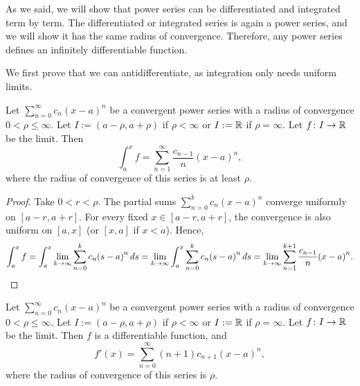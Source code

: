 As we said, we will show that
power series can be differentiated and integrated
term by term.  The 
differentiated or integrated series is again a power series,
and we will show it has the same radius of convergence.
Therefore, 
any power series defines an infinitely differentiable function.

We first prove that we can antidifferentiate, as integration only needs
uniform limits.

\begin{cor}
Let $\sum_{n=0}^\infty c_n {(x-a)}^n$ be a convergent power series with a radius
of convergence $0 < \rho \leq \infty$.
Let $I := (a-\rho,a+\rho)$ if $\rho < \infty$
or $I := {\mathbb{R}}$ if $\rho= \infty$.  Let $f \colon I \to {\mathbb{R}}$ be the limit.
Then
\begin{equation*}
\int_a^x f = \sum_{n=1}^\infty \frac{c_{n-1}}{n} {(x-a)}^{n} ,
\end{equation*}
where the radius of convergence of this series is at least $\rho$.
\end{cor}

\begin{proof}
Take $0 < r < \rho$.
The partial sums $\sum_{n=0}^k c_n {(x-a)}^n$ converge uniformly on $[a-r,a+r]$.
For every fixed $x \in [a-r,a+r]$, the convergence is also uniform
on $[a,x]$ (or $[x,a]$ if $x < a$).
Hence,
\begin{equation*}
\int_a^x f =
\int_a^x \lim_{k\to\infty} \sum_{n=0}^k c_n {(s-a)}^n \, ds
=
\lim_{k\to\infty}
\int_a^x \sum_{n=0}^k c_n {(s-a)}^n \, ds
=
\lim_{k\to\infty}
\sum_{n=1}^{k+1} \frac{c_{n-1}}{n} {(x-a)}^{n} . \qedhere
\end{equation*}
\end{proof}


\begin{cor} \label{cor:differentiatepowerser}
Let $\sum_{n=0}^\infty c_n {(x-a)}^n$ be a convergent power series with a radius
of convergence $0 < \rho \leq \infty$.
Let $I := (a-\rho,a+\rho)$ if $\rho < \infty$
or $I := {\mathbb{R}}$ if $\rho= \infty$.  Let $f \colon I \to {\mathbb{R}}$ be the limit.
Then $f$ is a differentiable function, and
\begin{equation*}
f'(x) = \sum_{n=0}^\infty (n+1) c_{n+1} {(x-a)}^{n} ,
\end{equation*}
where the radius of convergence of this series is $\rho$.
\end{cor}

